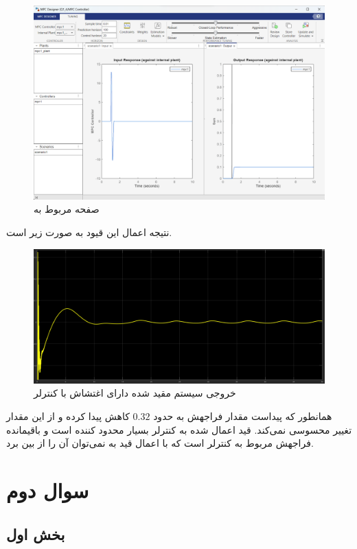\documentclass[14pt, a4paper]{extarticle}
\begin{document}
 \begin{figure}[h!]
	\centering
	\includegraphics[scale = 0.5]{Q1_5_mpc.png}
	\caption{صفحه مربوط به 
		}
\end{figure}

نتیجه اعمال این قیود به صورت زیر است.

\begin{figure}[h!]
	\centering
	\includegraphics[scale = 0.4]{Q1_5_result.png}
	\caption{خروجی سیستم مقید شده دارای اغتشاش با کنترلر 
		}
\end{figure}

همانطور که پیداست مقدار فراجهش به حدود 
$0.32$
کاهش پیدا کرده و از این مقدار تغییر محسوسی نمی‌کند. قید اعمال شده به کنترلر بسیار محدود کننده است و باقیمانده فراجهش مربوط به کنترلر 
است که با اعمال قید به 
نمی‌توان آن را از بین برد.  


\newpage

\section{سوال دوم}
\subsection{بخش اول}
\end{document}
